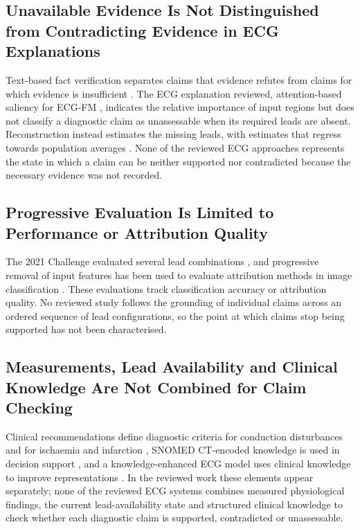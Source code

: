 \subsection*{Unavailable Evidence Is Not Distinguished from Contradicting Evidence in ECG Explanations}
Text-based fact verification separates claims that evidence refutes from claims for which evidence is insufficient \cite{THORNE2018FEVER}. The ECG explanation reviewed, attention-based saliency for ECG-FM \cite{MCKEEN2025ECGFM}, indicates the relative importance of input regions but does not classify a diagnostic claim as unassessable when its required leads are absent. Reconstruction instead estimates the missing leads, with estimates that regress towards population averages \cite{PRESACAN2025RECON}. None of the reviewed ECG approaches represents the state in which a claim can be neither supported nor contradicted because the necessary evidence was not recorded.

\subsection*{Progressive Evaluation Is Limited to Performance or Attribution Quality}
The 2021 Challenge evaluated several lead combinations \cite{REYNA2022ISSUES}, and progressive removal of input features has been used to evaluate attribution methods in image classification \cite{HOOKER2019ROAR}. These evaluations track classification accuracy or attribution quality. No reviewed study follows the grounding of individual claims across an ordered sequence of lead configurations, so the point at which claims stop being supported has not been characterised.

\subsection*{Measurements, Lead Availability and Clinical Knowledge Are Not Combined for Claim Checking}
Clinical recommendations define diagnostic criteria for conduction disturbances and for ischaemia and infarction \cite{SURAWICZ2009AHA,WAGNER2009AHA}, SNOMED CT-encoded knowledge is used in decision support \cite{SNOMED2026CDSGUIDE}, and a knowledge-enhanced ECG model uses clinical knowledge to improve representations \cite{LIU2025ARBITRARY}. In the reviewed work these elements appear separately; none of the reviewed ECG systems combines measured physiological findings, the current lead-availability state and structured clinical knowledge to check whether each diagnostic claim is supported, contradicted or unassessable.

